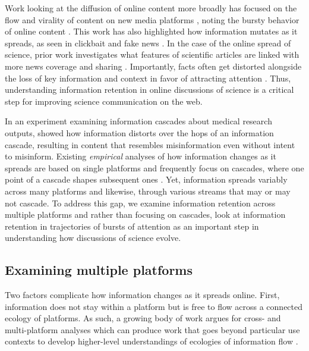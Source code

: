 \documentclass[letterpaper]{article} %
\begin{document}
Work looking at the diffusion of online content more broadly has focused on the flow and virality of content on new media platforms \cite{adarTrackingInformationEpidemics2005,adamicInformationEvolutionSocial2016,lakkarajuWhatNameUnderstanding2013,lermanInformationContagionEmpirical2010, romeroDifferencesMechanicsInformation2011,bakshyRoleSocialNetworks2012}, noting the bursty %
behavior of online content \citep{chengCanCascadesBe2014,chengCascadesRecur2016}. This work has also highlighted how information mutates as it spreads, as seen in clickbait and fake news \cite{chenMisleadingOnlineContent2015,vosoughiSpreadTrueFalse2018,lazerScienceFakeNews2018,guptaFakingSandyCharacterizing2013}.
In the case of the online spread of science, prior work investigates what features of scientific articles are linked with more news coverage and sharing \citep{milkmanScienceSharingSharing2014,maclaughlinPredictingNewsCoverage2018}. Importantly, facts often get distorted alongside the loss of key information and context in favor of attracting attention \citep[see for example][]{burnettHowMediaWarp2017}. Thus, understanding information retention in online discussions of science is a critical step for improving science communication on the web.

In an experiment examining information cascades about medical research outputs, \citet{ribeiroMessageDistortionInformation2019} showed how information distorts over the hops of an information cascade, resulting in content that resembles misinformation even without intent to misinform.
Existing \textit{empirical} analyses of how information changes as it spreads are based on single platforms and frequently focus on cascades, where one point of a cascade shapes subsequent ones \citep{easleyInformationCascades2010}. Yet, information spreads variably across many platforms and likewise, through various streams that may or may not cascade. To address this gap, we examine information retention across multiple platforms and rather than focusing on cascades, look at information retention in trajectories of bursts of attention as an important step in understanding how discussions of science evolve.


\subsection{Examining multiple platforms}
Two factors complicate how information changes as it spreads online. First, information does not stay within a platform but is free to flow across a connected ecology of platforms. As such, a growing body of work argues for cross- and multi-platform analyses which can produce work that goes beyond particular use contexts to develop higher-level understandings of ecologies of information flow \citep{hillStudyingPopulationsOnline2019,phadkeManyFacedHate2020,zakhlebinDiffusionScientificArticles2020,horvatBirdsFeatherFlock2021}.%
\end{document}
